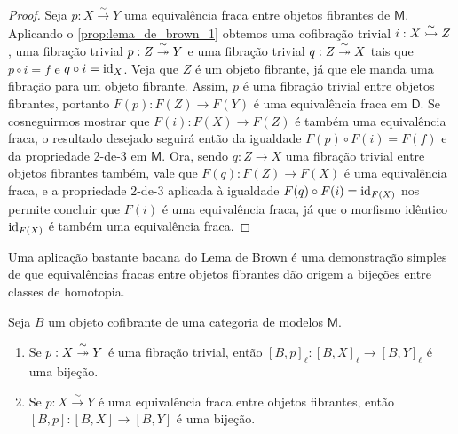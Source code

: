 \begin{proof}
  Seja $p: X \overset{\sim}{\to} Y$ uma equivalência fraca entre objetos fibrantes de $\mathsf{M}$.
  Aplicando o \cref{prop:lema_de_brown_1} obtemos uma cofibração trivial $i: X \overset{\sim}{\rightarrowtail} Z$, uma fibração trivial $p: Z \overset{\sim}{\twoheadrightarrow} Y$ e uma fibração trivial $q: Z \overset{\sim}{\twoheadrightarrow} X$ tais que $p \circ i = f$ e $q \circ i = \mathrm{id}_{X}$.
  Veja que $Z$ é um objeto fibrante, já que ele manda uma fibração para um objeto fibrante.
  Assim, $p$ é uma fibração trivial entre objetos fibrantes, portanto $F(p): F(Z) \to F(Y)$ é uma equivalência fraca em $\mathsf{D}$.
  Se cosneguirmos mostrar que $F(i): F(X) \to F(Z)$ é também uma equivalência fraca, o resultado desejado seguirá então da igualdade $F(p) \circ F(i) = F(f)$ e da propriedade 2-de-3 em $\mathsf{M}$.
  Ora, sendo $q: Z \to X$ uma fibração trivial entre objetos fibrantes também, vale que $F(q): F(Z) \to F(X)$ é uma equivalência fraca, e a propriedade 2-de-3 aplicada à igualdade $F(q) \circ F(i) = \mathrm{id}_{F(X)}$ nos permite concluir que $F(i)$ é uma equivalência fraca, já que o morfismo idêntico $\mathrm{id}_{F(X)}$ é também uma equivalência fraca.
\end{proof}

Uma aplicação bastante bacana do Lema de Brown é uma demonstração simples de que equivalências fracas entre objetos fibrantes dão origem a bijeções entre classes de homotopia.

\begin{prop}
  Seja $B$ um objeto cofibrante de uma categoria de modelos $\mathsf{M}$.
  \begin{enumerate}
  \item Se $p: X \overset{\sim}{\twoheadrightarrow} Y$ é uma fibração trivial, então $[B,p]_{\ell}: [B,X]_{\ell} \to [B,Y]_{\ell}$ é uma bijeção.
    
  \item Se $p: X \overset{\sim}{\to} Y$ é uma equivalência fraca entre objetos fibrantes, então $[B,p]: [B,X] \to [B,Y]$ é uma bijeção.
  \end{enumerate}
\end{prop}

